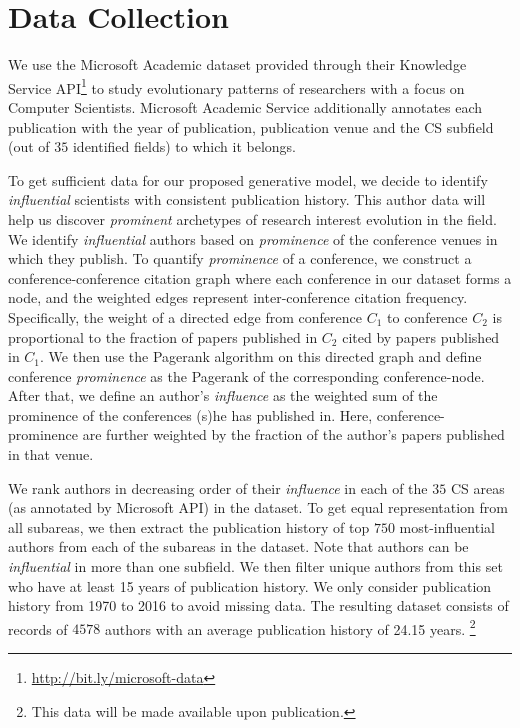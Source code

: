 \section{Data Collection}
\label{sec:dataset}

We use the Microsoft Academic dataset \cite{Sinha:2015} provided through their Knowledge Service API\footnote{\url{http://bit.ly/microsoft-data}} to study evolutionary patterns of researchers with a focus on Computer Scientists.
Microsoft Academic Service additionally annotates each publication with the year of publication, publication venue and the CS subfield (out of $35$ identified fields) to which it belongs.

To get sufficient data for our proposed generative model, we decide to identify \emph{influential} scientists with consistent publication history.  This author data will help us discover \emph{prominent} archetypes of research interest evolution in the field. We identify \emph{influential} authors based on \emph{prominence} of the conference venues in which they publish. To quantify \emph{prominence} of a conference, we construct a conference-conference citation graph where each conference in our dataset forms a node, and the weighted edges represent inter-conference citation frequency. Specifically, the weight of a directed edge from conference $C_1$ to conference $C_2$ is proportional to the fraction of papers published in $C_2$ cited by papers published in $C_1$. We then use the Pagerank algorithm \citep{ilprints422} on this directed graph and define conference \emph{prominence} as the Pagerank of the corresponding conference-node. After that, we define an author's \emph{influence} as the weighted sum of the prominence of the conferences (s)he has published in. Here, conference-prominence are further weighted by the fraction of the author's papers published in that venue.


We rank authors in decreasing order of their \emph{influence} in each of the $35$ CS areas (as annotated by Microsoft API) in the dataset. To get equal representation from all subareas, we then extract the publication history of top $750$ most-influential authors from each of the subareas in the dataset. Note that authors can be \emph{influential} in more than one subfield. We then filter unique authors from this set who have at least 15 years of publication history. We only consider publication history from 1970 to 2016 to avoid missing data. The resulting dataset consists of records of $4578$ authors with an average publication history of 24.15 years. \footnote{This data will be made available upon publication.}


